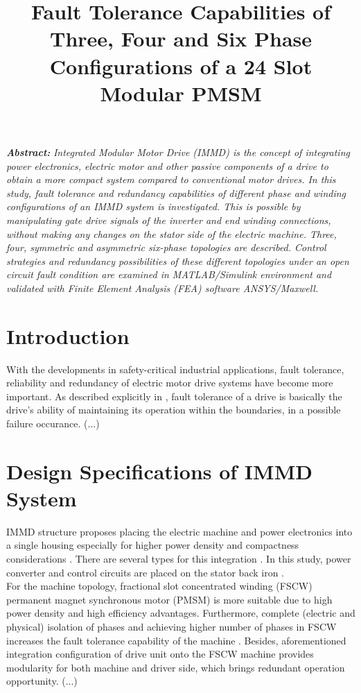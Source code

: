 \documentclass[a4paper,11pt]{article}
\title{\normalsize\textbf{Fault Tolerance Capabilities of Three, Four and Six Phase Configurations of a 24 Slot Modular PMSM}}
\date{}
\begin{document}
\vspace{-45mm}
\maketitle
\vspace{-23mm}
\textit{\normalsize\textbf{Abstract:}}
\textit{Integrated Modular Motor Drive (IMMD) is the concept of integrating power electronics, electric motor and other passive components of a drive to obtain a more compact system compared to conventional motor drives. In this study, fault tolerance and redundancy capabilities of different phase and winding configurations of an IMMD system is investigated. This is possible by manipulating gate drive signals of the inverter and end winding connections, without making any changes on the stator side of the electric machine. Three, four, symmetric and asymmetric six-phase topologies are described. Control strategies and redundancy possibilities of these different topologies under an open circuit fault condition are examined in MATLAB/Simulink environment and validated with Finite Element Analysis (FEA) software ANSYS/Maxwell. }

\section{\normalsize\textbf{Introduction}}
With the developments in safety-critical industrial applications, fault tolerance, reliability and redundancy of electric motor drive systems have become more important. As described explicitly in \cite{bible}, fault tolerance of a drive is basically the drive's ability of maintaining its operation within the boundaries, in a possible failure occurance. (...)

\section{\normalsize\textbf{Design Specifications of IMMD System}}
IMMD structure proposes placing the electric machine and power electronics into a single housing especially for higher power density and compactness considerations \cite{immd-bible}. There are several types for this integration \cite{difftopology1}\cite{difftopology2}. In this study, power converter and control circuits are placed on the stator back iron \cite{mesutto}. \\
For the machine topology, fractional slot concentrated winding (FSCW) permanent magnet synchronous motor (PMSM) is more suitable due to high power density and high efficiency advantages. Furthermore, complete (electric and physical) isolation of phases and achieving higher number of phases in FSCW increases the fault tolerance capability of the machine \cite{fscw}. Besides, aforementioned integration configuration of drive unit onto the FSCW machine provides modularity for both machine and driver side, which brings redundant operation opportunity. (...)
 
\end{document}
